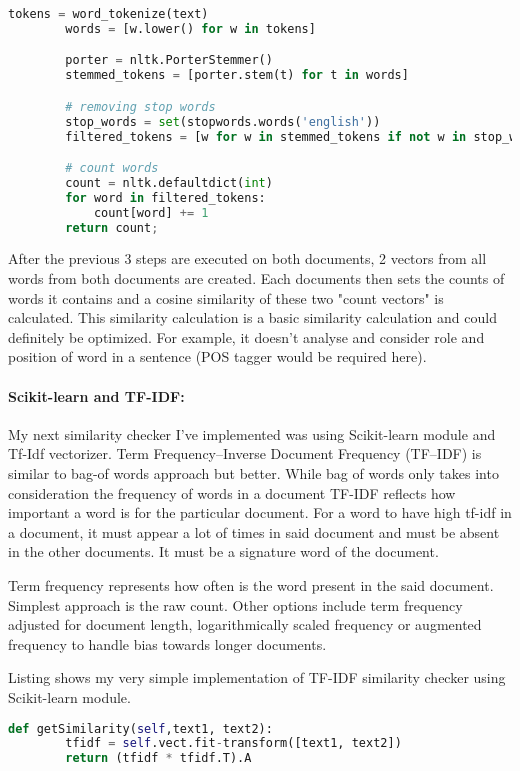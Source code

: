 \begin{lstlisting}[caption={Text similarity implementation with NLTK},label={lst:nltkTextSimilarity},language=Python]
		tokens = word_tokenize(text)
		words = [w.lower() for w in tokens]

		porter = nltk.PorterStemmer()
		stemmed_tokens = [porter.stem(t) for t in words]

		# removing stop words
		stop_words = set(stopwords.words('english'))
		filtered_tokens = [w for w in stemmed_tokens if not w in stop_words]

		# count words
		count = nltk.defaultdict(int)
		for word in filtered_tokens:
			count[word] += 1
		return count;
\end{lstlisting}

After the previous 3 steps are executed on both documents, 2 vectors from all words from both documents are created. Each documents then sets the counts of words it contains and a cosine similarity of these two "count vectors" is calculated. This similarity calculation is a basic similarity calculation and could definitely be optimized. For example, it doesn't analyse and consider role and position of word in a sentence (POS tagger would be required here). 

\paragraph{Scikit-learn and TF-IDF:}My next similarity checker I've implemented was using Scikit-learn module and Tf-Idf vectorizer. Term Frequency–Inverse Document Frequency (TF–IDF) is similar to bag-of words approach but better. While bag of words only takes into consideration the frequency of words in a document TF-IDF reflects how important a word is for the particular document. For a word to have high tf-idf in a document, it must appear a lot of times in said document and must be absent in the other documents. It must be a signature word of the document.

Term frequency represents how often is the word present in the said document. Simplest approach is the raw count. Other options include term frequency adjusted for document length, logarithmically scaled frequency or augmented frequency to handle bias towards longer documents.

Listing shows my very simple implementation of TF-IDF similarity checker using Scikit-learn module.

\begin{lstlisting}[caption={Text similarity implementation with Scikit using Tf-Idf model},label={lst:nltkTextSimilarity},language=Python]
		def getSimilarity(self,text1, text2):
		tfidf = self.vect.fit-transform([text1, text2])
		return (tfidf * tfidf.T).A
\end{lstlisting}

	
